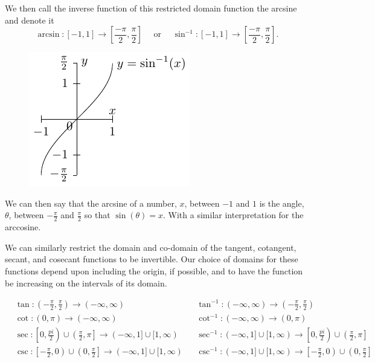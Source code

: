 \documentclass[
]{book}
\theoremstyle{definition}
\theoremstyle{definition}
\theoremstyle{definition}
\theoremstyle{remark}
\begin{document}
We then call the inverse function of this restricted domain function the arcsine and denote it
\[\arcsin:[-1,1] \rightarrow \left[\frac{-\pi}{2}, \frac{\pi}{2}\right] \quad \mbox{ or } \quad \sin^{-1}:[-1,1] \rightarrow \left[\frac{-\pi}{2}, \frac{\pi}{2}\right].\]

\begin{figure}

{\centering \includegraphics[width=0.4\linewidth]{tikz/arcsine} 

}

\end{figure}

We can then say that the arcsine of a number, \(x\), between \(-1\) and \(1\) is the angle, \(\theta\), between \(-\frac{\pi}{2}\) and \(\frac{\pi}{2}\) so that \(\sin(\theta) = x\). With a similar interpretation for the arccosine.

We can similarly restrict the domain and co-domain of the tangent, cotangent, secant, and cosecant functions to be invertible. Our choice of domains for these functions depend upon including the origin, if possible, and to have the function be increasing on the intervals of its domain.

\begin{align*}
  & \tan:\left( -\frac{\pi}{2},\frac{\pi}{2} \right) \rightarrow (-\infty,\infty) & & \tan^{-1}: (-\infty,\infty) \rightarrow \left( -\frac{\pi}{2},\frac{\pi}{2} \right)  \\
  & \cot:\left( 0,\pi\right) \rightarrow (-\infty,\infty)  & & \cot^{-1}: (-\infty,\infty)  \rightarrow \left( 0,\pi\right)  \\
  &  \sec: \left[0,\frac{pi}{2}\right) \cup \left(\frac{\pi}{2},\pi\right] \rightarrow (-\infty,1]\cup [1,\infty) & & \sec^{-1}: (-\infty,1]\cup [1,\infty)  \rightarrow \left[0,\frac{pi}{2}\right) \cup \left(\frac{\pi}{2},\pi\right]  \\
  &  \csc: \left[-\frac{\pi}{2},0\right) \cup \left( 0,\frac{\pi}{2}\right] \rightarrow (-\infty,1]\cup [1,\infty)  & & \csc^{-1}: (-\infty,1]\cup [1,\infty)\rightarrow  \left[-\frac{\pi}{2},0\right) \cup \left( 0,\frac{\pi}{2}\right]   \\
\end{align*}
\end{document}
